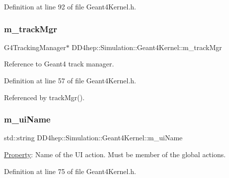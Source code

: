 Definition at line 92 of file Geant4\+Kernel.\+h.

\hypertarget{class_d_d4hep_1_1_simulation_1_1_geant4_kernel_a4bd577a1215149f49a745aa75b652565}{}\label{class_d_d4hep_1_1_simulation_1_1_geant4_kernel_a4bd577a1215149f49a745aa75b652565} 
\subsubsection{\texorpdfstring{m\+\_\+track\+Mgr}{m\_trackMgr}}
{\footnotesize\ttfamily G4\+Tracking\+Manager$\ast$ D\+D4hep\+::\+Simulation\+::\+Geant4\+Kernel\+::m\+\_\+track\+Mgr\hspace{0.3cm}{\ttfamily [protected]}}



Reference to Geant4 track manager. 



Definition at line 57 of file Geant4\+Kernel.\+h.



Referenced by track\+Mgr().

\hypertarget{class_d_d4hep_1_1_simulation_1_1_geant4_kernel_aea869c039be9e0818e4f80afbab1e47c}{}\label{class_d_d4hep_1_1_simulation_1_1_geant4_kernel_aea869c039be9e0818e4f80afbab1e47c} 
\subsubsection{\texorpdfstring{m\+\_\+ui\+Name}{m\_uiName}}
{\footnotesize\ttfamily std\+::string D\+D4hep\+::\+Simulation\+::\+Geant4\+Kernel\+::m\+\_\+ui\+Name\hspace{0.3cm}{\ttfamily [protected]}}



\hyperlink{class_d_d4hep_1_1_property}{Property}\+: Name of the UI action. Must be member of the global actions. 



Definition at line 75 of file Geant4\+Kernel.\+h.



